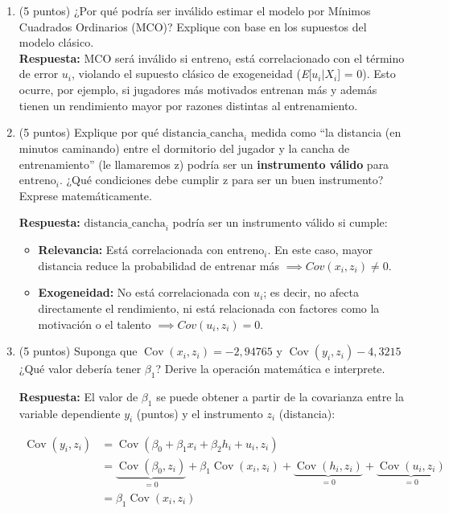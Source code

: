 \documentclass[10pt,a4paper]{article}
\begin{document}
\begin{enumerate}
\begin{enumerate}
    \item (5 puntos) ¿Por qué podría ser inválido estimar el modelo por Mínimos Cuadrados Ordinarios (MCO)? Explique con base en los supuestos del modelo clásico.\\
{\color{blue}
    \textbf{Respuesta:} MCO será inválido si $\text{entreno}_i$ está correlacionado con el término de error $u_i$, violando el supuesto clásico de exogeneidad (\textit{E}[$u_i | X_i$] = 0). Esto ocurre, por ejemplo, si jugadores más motivados entrenan más y además tienen un rendimiento mayor por razones distintas al entrenamiento.}

    \item (5 puntos) Explique por qué $\text{distancia\_cancha}_i$ medida como ``la distancia (en minutos caminando) entre el dormitorio del jugador y la cancha de entrenamiento'' (le llamaremos z) podría ser un \textbf{instrumento válido} para $\text{entreno}_i$. ¿Qué condiciones debe cumplir z para ser un buen instrumento? Exprese matemáticamente.\\
{\color{blue}
    \textbf{Respuesta:} $\text{distancia\_cancha}_i$ podría ser un instrumento válido si cumple:
    \begin{itemize}
        \item \textbf{Relevancia:} Está correlacionada con $\text{entreno}_i$. En este caso, mayor distancia reduce la probabilidad de entrenar más $\implies Cov(x_i, z_i) \neq 0$.
        \item \textbf{Exogeneidad:} No está correlacionada con $u_i$; es decir, no afecta directamente el rendimiento, ni está relacionada con factores como la motivación o el talento $\implies Cov(u_i, z_i) = 0$.
    \end{itemize}
    }

    \item (5 puntos) Suponga que $\operatorname{Cov}(x_i, z_i) = -2,94765$ y $\operatorname{Cov}(y_i, z_i) -4,3215$ ¿Qué valor debería tener $\beta_1$? Derive la operación matemática e interprete.\\

{\color{blue}
   \textbf{Respuesta:} El valor de $\beta_1$ se puede obtener a partir de la covarianza entre la variable dependiente $y_i$ (puntos) y el instrumento $z_i$ (distancia):

\[
\begin{aligned}
\operatorname{Cov}(y_i, z_i) &= \operatorname{Cov}(\beta_0 + \beta_1 x_i + \beta_2 h_i + u_i, z_i) \\
&= \underbrace{\operatorname{Cov}(\beta_0, z_i)}_{= 0} + \beta_1 \operatorname{Cov}(x_i, z_i) + \underbrace{\operatorname{Cov}(h_i, z_i)}_{= 0} + \underbrace{\operatorname{Cov}(u_i, z_i)}_{= 0} \\
&= \beta_1 \operatorname{Cov}(x_i, z_i)
\end{aligned}
\]

}
\end{enumerate}
\end{enumerate}
\end{document}
